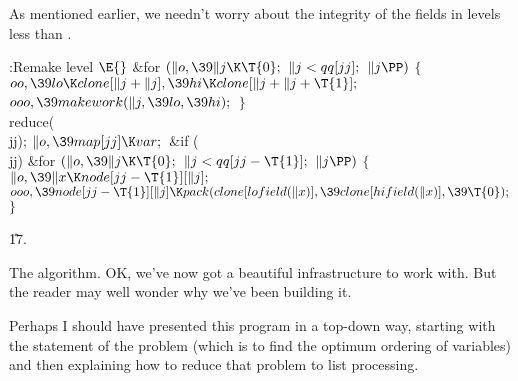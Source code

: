 As mentioned earlier, we needn't worry about the integrity of the
 fields in levels less than .

\Y\B\4:Remake level \X${}\E{}$\6
\&{for} ${}(\|o,\39\|j\K\T{0};{}$ ${}\|j<\\{qq}[\\{jj}];{}$ ${}\|j\PP){}$\5
${}\{{}$\1\6
${}\\{oo},\39\\{lo}\K\\{clone}[\|j+\|j],\39\\{hi}\K\\{clone}[\|j+\|j+\T{1}];{}$%
\6
${}\\{ooo},\39\\{makework}(\|j,\39\\{lo},\39\\{hi});{}$\6
\4${}\}{}$\2\6
\\{reduce}(\\{jj});\6
${}\|o,\39\\{map}[\\{jj}]\K\\{var};{}$\6
\&{if} (\\{jj})\1\6
\&{for} ${}(\|o,\39\|j\K\T{0};{}$ ${}\|j<\\{qq}[\\{jj}-\T{1}];{}$ ${}\|j\PP){}$%
\5
${}\{{}$\1\6
${}\|o,\39\|x\K\\{node}[\\{jj}-\T{1}][\|j];{}$\6
${}\\{ooo},\39\\{node}[\\{jj}-\T{1}][\|j]\K\\{pack}(\\{clone}[\\{lofield}(%
\|x)],\39\\{clone}[\\{hifield}(\|x)],\39\T{0});{}$\6
\4${}\}{}$\2\2\par
\U17.\fi

The algorithm. OK, we've now got a beautiful infrastructure to work
with.
But the reader may well wonder why we've been building it.

Perhaps I should have presented this program in a top-down way,
starting with the statement of the problem (which is to find the optimum
ordering of variables) and then explaining how to reduce that problem
to list processing.

